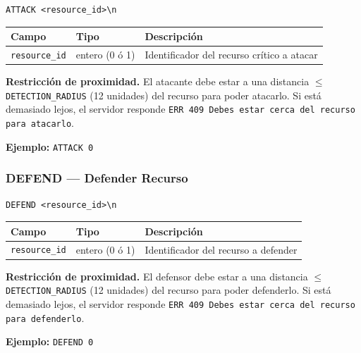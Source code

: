 \documentclass[12pt, letterpaper]{article}
\begin{document}
\begin{lstlisting}
ATTACK <resource_id>\n
\end{lstlisting}

\begin{table}[H]
\centering
\begin{tabularx}{\textwidth}{l l X}
\toprule
\textbf{Campo} & \textbf{Tipo} & \textbf{Descripción} \\
\midrule
\texttt{resource\_id} & entero (0 ó 1) & Identificador del recurso crítico a atacar \\
\bottomrule
\end{tabularx}
\end{table}

\begin{nota}
\textbf{Restricción de proximidad.} El atacante debe estar a una distancia $\leq$ \texttt{DETECTION\_RADIUS} (12 unidades) del recurso para poder atacarlo. Si está demasiado lejos, el servidor responde \texttt{ERR 409 Debes estar cerca del recurso para atacarlo}.
\end{nota}

\textbf{Ejemplo:} \texttt{ATTACK 0}

\subsubsection{DEFEND --- Defender Recurso}

\begin{lstlisting}
DEFEND <resource_id>\n
\end{lstlisting}

\begin{table}[H]
\centering
\begin{tabularx}{\textwidth}{l l X}
\toprule
\textbf{Campo} & \textbf{Tipo} & \textbf{Descripción} \\
\midrule
\texttt{resource\_id} & entero (0 ó 1) & Identificador del recurso a defender \\
\bottomrule
\end{tabularx}
\end{table}

\begin{nota}
\textbf{Restricción de proximidad.} El defensor debe estar a una distancia $\leq$ \texttt{DETECTION\_RADIUS} (12 unidades) del recurso para poder defenderlo. Si está demasiado lejos, el servidor responde \texttt{ERR 409 Debes estar cerca del recurso para defenderlo}.
\end{nota}

\textbf{Ejemplo:} \texttt{DEFEND 0}
\end{document}
